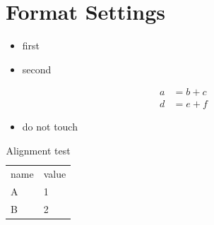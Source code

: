 \documentclass{article}
\newenvironment{myverbatim}{\verbatim}{\endverbatim}
\begin{document}
\section{Format Settings}

\begin{itemize}
\item first
  \item second
\end{itemize}

\begin{align}
  a&=b+c\\
  d &= e + f
\end{align}

\begin{myverbatim}
\begin{itemize}
\item do not touch
\end{itemize}
\end{myverbatim}

\begin{table}[htbp]
\centering
\begin{tabular}{ll}
name&value\\
A&1\\
B&2
\end{tabular}
\caption{Alignment test}
\label{tab:format}
\end{table}
\end{document}
